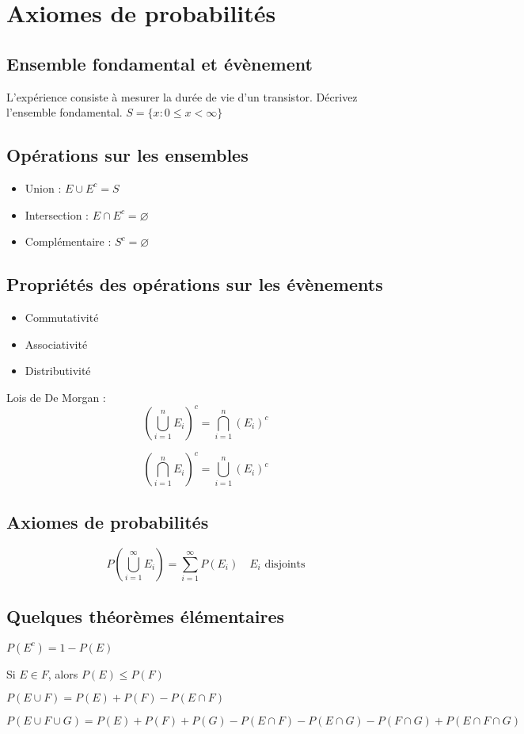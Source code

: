 \chapter{Axiomes de probabilités}
\section{Ensemble fondamental et évènement}

 L’expérience consiste à mesurer la durée de vie d’un transistor. Décrivez l’ensemble fondamental.
 $S =\{x : 0 \leq x < \infty\}$





\section{Opérations sur les ensembles}
\begin{itemize}
	\item Union : $E \cup E^c = S$
	\item Intersection : $E \cap E^c = \varnothing$
	\item Complémentaire : $S^c = \varnothing$
\end{itemize}

\section{Propriétés des opérations sur les évènements}
\begin{itemize}
	\item Commutativité
	\item Associativité
	\item Distributivité
\end{itemize}

Lois de De Morgan :
\[\left(\bigcup_{i=1}^{n} E_i\right)^c = \bigcap_{i=1}^{n}\left(E_i\right)^c\]

\[\left(\bigcap_{i=1}^{n} E_i\right)^c = \bigcup_{i=1}^{n}\left(E_i\right)^c\]

\section{Axiomes de probabilités}
\[P\left(\bigcup_{i=1}^{\infty} E_i\right) = \sum_{i=1}^{\infty}P(E_i)\quad E_i \text{ disjoints}\]

\section{Quelques théorèmes élémentaires}
$P(E^c) = 1 - P(E)$

Si $E \in F$, alors $P(E) \leq P(F)$

$P(E \cup F) = P(E) + P(F) - P(E \cap F)$

$P(E \cup F \cup G) = P(E) + P(F) + P(G) - P(E \cap F) - P(E \cap G) - P(F \cap G) + P(E \cap F \cap G)$